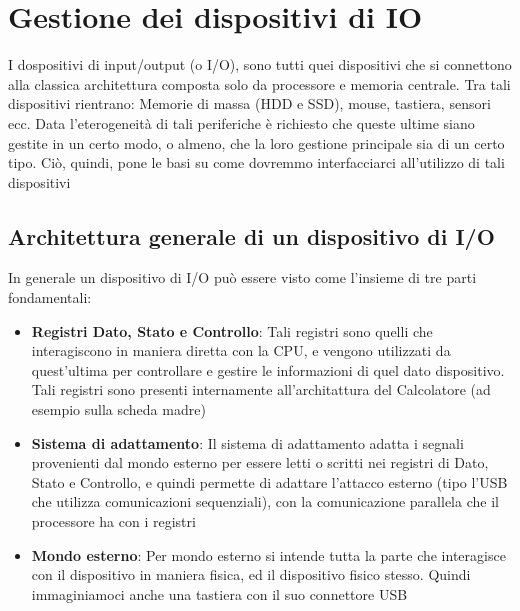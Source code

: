 \chapter{Gestione dei dispositivi di IO}
I dospositivi di input/output (o I/O), sono tutti quei dispositivi che si connettono alla classica architettura composta solo da processore e memoria centrale. Tra tali dispositivi rientrano: Memorie di massa (HDD e SSD), mouse, tastiera, sensori ecc.
Data l'eterogeneità di tali periferiche è richiesto che queste ultime siano gestite in un certo modo, o almeno, che la loro gestione principale sia di un certo tipo. Ciò, quindi, pone le basi su come dovremmo interfacciarci all'utilizzo di tali dispositivi

\section{Architettura generale di un dispositivo di I/O}
In generale un dispositivo di I/O può essere visto come l'insieme di tre parti fondamentali:
\begin{itemize}

    \item \textbf{Registri Dato, Stato e Controllo}: Tali registri sono quelli che interagiscono in maniera diretta con la CPU, e vengono utilizzati da quest'ultima per controllare e gestire le informazioni di quel dato dispositivo. Tali registri sono presenti internamente all'architattura del Calcolatore (ad esempio sulla scheda madre)
    
    \item \textbf{Sistema di adattamento}: Il sistema di adattamento adatta i segnali provenienti dal mondo esterno per essere letti o scritti nei registri di Dato, Stato e Controllo, e quindi permette di adattare l'attacco esterno (tipo l'USB che utilizza comunicazioni sequenziali), con la comunicazione parallela che il processore ha con i registri
    
    \item \textbf{Mondo esterno}: Per mondo esterno si intende tutta la parte che interagisce con il dispositivo in maniera fisica, ed il dispositivo fisico stesso. Quindi immaginiamoci anche una tastiera con il suo connettore USB

\end{itemize}

